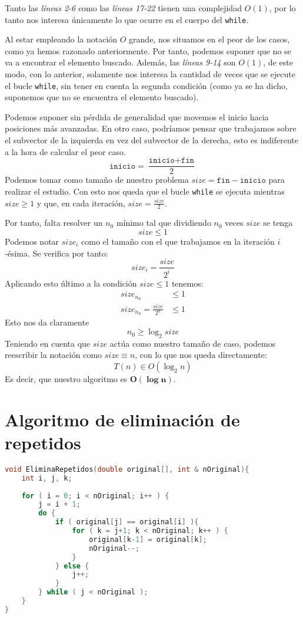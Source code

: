 \documentclass[10pt, a4paper]{article}
\theoremstyle{theorem-style}
\theoremstyle{theorem-style}
\theoremstyle{definition-style}
\theoremstyle{remark-style}
\theoremstyle{example-style}
\theoremstyle{definition-style}
\theoremstyle{remark-style}
\begin{document}
Tanto las \emph{líneas 2-6} como las \emph{líneas 17-22} tienen una complejidad $O(1)$, por lo tanto nos interesa únicamente lo que ocurre en el cuerpo del \texttt{while}.

Al estar empleando la notación $O$ grande, nos situamos en el peor de los casos, como ya hemos razonado anteriormente. Por tanto, podemos suponer que no se va a encontrar el elemento buscado. Además, las \emph{líneas 9-14} son $O(1)$, de este modo, con lo anterior, solamente nos interesa la cantidad de veces que se ejecute el bucle \texttt{while}, sin tener en cuenta la segunda condición (como ya se ha dicho, suponemos que no se encuentra el elemento buscado).

Podemos suponer sin pérdida de generalidad que movemos el inicio hacia posiciones más avanzadas. En otro caso, podríamos pensar que trabajamos sobre el subvector de la izquierda en vez del subvector de la derecha, esto es indiferente a la hora de calcular el peor caso. 
$$ \texttt{inicio} = \frac{\texttt{inicio} + \texttt{fin}}{2} $$
Podemos tomar como tamaño de nuestro problema $size = \texttt{fin} - \texttt{inicio}$ para realizar el estudio. Con esto nos queda que el bucle \texttt{while} se ejecuta mientras $size \geq 1$ y que, en cada iteración, $size = \frac{size}{2}$.

Por tanto, falta resolver un $n_0$ mínimo tal que dividiendo $n_0$ veces $size$ se tenga 
$$ size \leq 1 $$
Podemos notar $size_i$ como el tamaño con el que trabajamos en la iteración $i$-ésima. Se verifica por tanto:
$$ size_i = \frac{size}{2^i} $$
Aplicando esto último a la condición $size \leq 1$ tenemos:
\begin{align*}
size_{n_0} &\leq 1\\
size_{n_0} = \frac{size}{2^n} &\leq 1
\end{align*}
Esto nos da claramente
$$ n_0 \geq \log_2{size} $$
Teniendo en cuenta que $size$ actúa como nuestro tamaño de caso, podemos reescribir la notación como $size \equiv n$, con lo que nos queda directamente:
$$ T(n) \in O(\log_2{n}) $$
Es decir, que nuestro algoritmo es $\boldsymbol{O(\log n)}$.

\section{Algoritmo de eliminación de repetidos}

\begin{lstlisting}[language=C]
void EliminaRepetidos(double original[], int & nOriginal){
	int i, j, k;
	
	for ( i = 0; i < nOriginal; i++ ) {
		j = i + 1;
		do {
			if ( original[j] == original[i] ){
				for ( k = j+1; k < nOriginal; k++ ) {
					original[k-1] = original[k];
					nOriginal--;
				}
			} else {
				j++;
			}
		} while ( j < nOriginal );
	}
}
\end{lstlisting}
\end{document}
